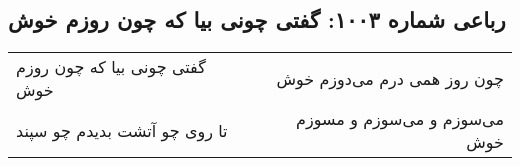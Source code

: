 \begin{center}
\section*{رباعی شماره ۱۰۰۳: گفتی چونی بیا که چون روزم خوش}
\label{sec:1003}
\begin{longtable}{l p{0.5cm} r}
گفتی چونی بیا که چون روزم خوش
&&
چون روز همی درم می‌دوزم خوش
\\
تا روی چو آتشت بدیدم چو سپند
&&
می‌سوزم و می‌سوزم و مسوزم خوش
\\
\end{longtable}
\end{center}
